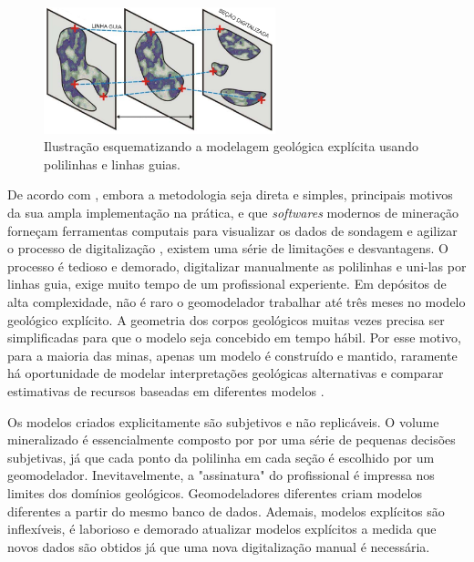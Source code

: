 \begin{figure}[!htb]
	\caption{\label{explicitmodeling}Ilustração esquematizando a modelagem geológica explícita usando polilinhas e linhas guias.}
	\begin{center}
		\includegraphics[width=0.6\textwidth]{capitulo_1/explicitmodeling}
	\end{center}
\end{figure}

De acordo com , embora a metodologia seja direta e simples, principais motivos da sua ampla implementação na prática, e que \textit{softwares} modernos de mineração forneçam ferramentas computais para visualizar os dados de sondagem e agilizar o processo de digitalização \cite{silvaenhancedgeomodeling}, existem uma série de limitações e desvantagens. O processo é tedioso e demorado, digitalizar manualmente as polilinhas e uni-las por linhas guia, exige muito tempo de um profissional experiente. Em depósitos de alta complexidade, não é raro o geomodelador trabalhar até três meses no modelo geológico explícito. A geometria dos corpos geológicos muitas vezes precisa ser simplificadas para que o modelo seja concebido em tempo hábil. Por esse motivo, para a maioria das minas, apenas um modelo é construído e mantido, raramente há oportunidade de modelar interpretações geológicas alternativas e comparar estimativas de recursos baseadas em diferentes modelos \cite{cowan2003practical}.

Os modelos criados explicitamente são subjetivos e não replicáveis. O volume mineralizado é essencialmente composto por por uma série de pequenas decisões subjetivas, já que cada ponto da polilinha em cada seção é escolhido por um geomodelador. Inevitavelmente, a "assinatura" do profissional é impressa nos limites dos domínios geológicos. Geomodeladores diferentes criam modelos diferentes a partir do mesmo banco de dados. Ademais, modelos explícitos são inflexíveis, é laborioso e demorado atualizar modelos explícitos a medida que novos dados são obtidos já que uma nova digitalização manual é necessária.

